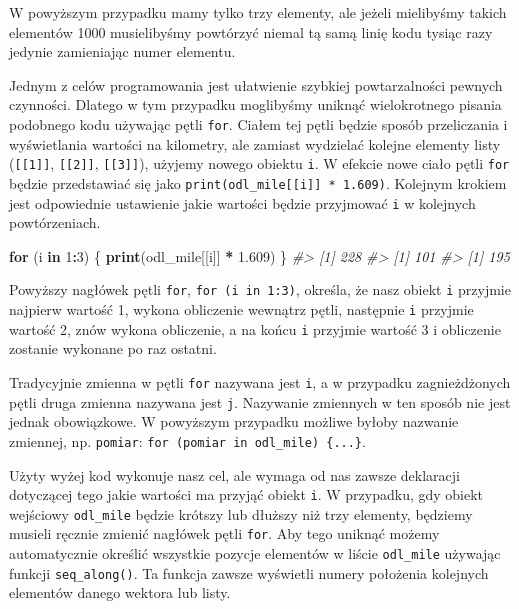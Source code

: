 \documentclass[paper=6in:9in,pagesize=pdftex,headinclude=on,footinclude=on,10pt]{scrbook}
\newenvironment{Shaded}{\begin{snugshade}}{\end{snugshade}}
\newcommand{\CommentTok}[1]{\textcolor[rgb]{0.56,0.35,0.01}{\textit{#1}}}
\newcommand{\ControlFlowTok}[1]{\textcolor[rgb]{0.13,0.29,0.53}{\textbf{#1}}}
\newcommand{\DecValTok}[1]{\textcolor[rgb]{0.00,0.00,0.81}{#1}}
\newcommand{\FloatTok}[1]{\textcolor[rgb]{0.00,0.00,0.81}{#1}}
\newcommand{\KeywordTok}[1]{\textcolor[rgb]{0.13,0.29,0.53}{\textbf{#1}}}
\newcommand{\NormalTok}[1]{#1}
\newcommand{\OperatorTok}[1]{\textcolor[rgb]{0.81,0.36,0.00}{\textbf{#1}}}
\newcommand{\StringTok}[1]{\textcolor[rgb]{0.31,0.60,0.02}{#1}}
\let\BeginKnitrBlock\begin \let\EndKnitrBlock\end
\begin{document}
W powyższym przypadku mamy tylko trzy elementy, ale jeżeli mielibyśmy takich elementów 1000 musielibyśmy powtórzyć niemal tą samą linię kodu tysiąc razy jedynie zamieniając numer elementu.

Jednym z celów programowania jest ułatwienie szybkiej powtarzalności pewnych czynności.
Dlatego w tym przypadku moglibyśmy uniknąć wielokrotnego pisania podobnego kodu używając pętli \texttt{for}.
Ciałem tej pętli będzie sposób przeliczania i wyświetlania wartości na kilometry, ale zamiast wydzielać kolejne elementy listy (\texttt{{[}{[}1{]}{]}}, \texttt{{[}{[}2{]}{]}}, \texttt{{[}{[}3{]}{]}}), użyjemy nowego obiektu \texttt{i}.
W efekcie nowe ciało pętli \texttt{for} będzie przedstawiać się jako \texttt{print(odl\_mile{[}{[}i{]}{]}\ *\ 1.609)}.
Kolejnym krokiem jest odpowiednie ustawienie jakie wartości będzie przyjmować \texttt{i} w kolejnych powtórzeniach.

\begin{Shaded}
\begin{Highlighting}[]
\ControlFlowTok{for}\NormalTok{ (i }\ControlFlowTok{in} \DecValTok{1}\OperatorTok{:}\DecValTok{3}\NormalTok{) \{}
  \KeywordTok{print}\NormalTok{(odl_mile[[i]] }\OperatorTok{*}\StringTok{ }\FloatTok{1.609}\NormalTok{)}
\NormalTok{\}}
\CommentTok{#> [1] 228}
\CommentTok{#> [1] 101}
\CommentTok{#> [1] 195}
\end{Highlighting}
\end{Shaded}

Powyższy nagłówek pętli \texttt{for}, \texttt{for\ (i\ in\ 1:3)}, określa, że nasz obiekt \texttt{i} przyjmie najpierw wartość 1, wykona obliczenie wewnątrz pętli, następnie \texttt{i} przyjmie wartość 2, znów wykona obliczenie, a na końcu \texttt{i} przyjmie wartość 3 i obliczenie zostanie wykonane po raz ostatni.

\BeginKnitrBlock{rmdinfo}
Tradycyjnie zmienna w pętli \texttt{for} nazywana jest \texttt{i}, a w przypadku zagnieżdżonych pętli druga zmienna nazywana jest \texttt{j}.
Nazywanie zmiennych w ten sposób nie jest jednak obowiązkowe.
W powyższym przypadku możliwe byłoby nazwanie zmiennej, np. \texttt{pomiar}: \texttt{for\ (pomiar\ in\ odl\_mile)\ \{...\}}.
\EndKnitrBlock{rmdinfo}

Użyty wyżej kod wykonuje nasz cel, ale wymaga od nas zawsze deklaracji dotyczącej tego jakie wartości ma przyjąć obiekt \texttt{i}.
W przypadku, gdy obiekt wejściowy \texttt{odl\_mile} będzie krótszy lub dłuższy niż trzy elementy, będziemy musieli ręcznie zmienić nagłówek pętli \texttt{for}.
Aby tego uniknąć możemy automatycznie określić wszystkie pozycje elementów w liście \texttt{odl\_mile} używając funkcji \texttt{seq\_along()}.
Ta funkcja zawsze wyświetli numery położenia kolejnych elementów danego wektora lub listy.
\end{document}
